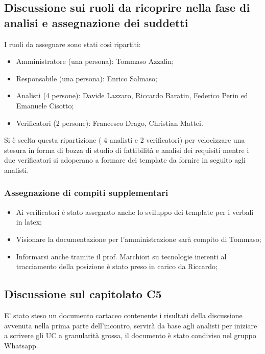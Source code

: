 \subsection{ Discussione sui ruoli da ricoprire nella fase di analisi e assegnazione dei suddetti}
I ruoli da assegnare sono stati così ripartiti: 
\begin{itemize}
\item Amministratore (una persona): Tommaso Azzalin;
\item Responsabile (una persona): Enrico Salmaso;
\item Analisti (4 persone): Davide Lazzaro, Riccardo Baratin, Federico Perin ed Emanuele Cisotto;
\item Verificatori (2 persone): Francesco Drago, Christian Mattei.
\end{itemize}
Si è scelta questa ripartizione ( 4 analisti e 2 verificatori) per velocizzare una stesura in forma di bozza di studio di fattibilità e analisi dei requisiti mentre i due verificatori si adoperano a formare dei template da fornire in seguito agli analisti.

\subsubsection{Assegnazione di compiti supplementari}
\begin{itemize}
\item Ai verificatori è stato assegnato anche lo sviluppo dei template per i verbali in latex;
\item Visionare la documentazione per l'amministrazione sarà compito di Tommaso;
\item Informarsi anche tramite il prof. Marchiori su tecnologie inerenti al tracciamento della posizione è stato preso in carico da Riccardo;
\end{itemize}
\subsection{Discussione sul capitolato C5}
E' stato steso un documento cartaceo contenente i risultati della discussione avvenuta nella prima parte dell'incontro, servirà da base agli analisti per iniziare a scrivere gli UC a granularità grossa, il documento è stato condiviso nel gruppo Whatsapp.
\clearpage